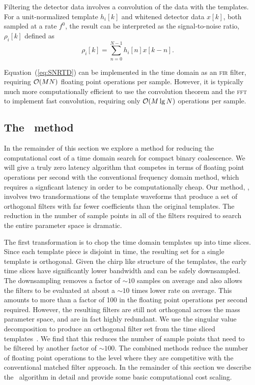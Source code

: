 Filtering the detector data involves a convolution of the data with the
templates.  For a unit-normalized template $h_i[k]$ and whitened detector data $x[k]$, both sampled at a rate $f^0$, the result can be interpreted as the signal-to-noise ratio, $\rho_i[k]$ defined as
%
%
\begin{equation}
	\label{eq:SNRTD}
	\rho_i [k] = \sum_{n=0}^{N-1} h_{i}[n] x [k-n].
\end{equation}

Equation~(\ref{eq:SNRTD}) can be implemented in the time domain as an \textsc{fir} filter, requiring $\mathcal O(M N)$ floating point operations per sample.  However, it is typically much more computationally efficient to use the convolution theorem and the \textsc{fft} to implement fast convolution, requiring only $\mathcal O(M \lg N)$ operations per sample.


\subsection{The \lloid\ method}

In the remainder of this section we explore a method for reducing the
computational cost of a time domain search for compact binary coalescence.  We
will give a truly zero latency algorithm that competes in terms of floating point
operations per second with the conventional frequency domain method, which requires a
signficant latency in order to be computationally cheap. Our method, \lloid{},
involves two transformations of the template waveforms that produce a set of orthogonal
filters with far fewer coefficients than the original templates.  The reduction
in the number of sample points in all of the filters required to search the entire
parameter space is dramatic.  

The first transformation is to chop the time domain templates up into time
slices.  Since each template piece is disjoint in time, the resulting set for a
single template is orthogonal.  Given the chirp like structure of the
templates, the early time slices have significantly lower bandwidth and can be
safely downsampled.  The downsampling removes a factor of $\sim 10$ samples on
%
%
average and also allows the filters to be evaluated at about a $\sim 10$ times
lower rate on average.  This amounts to more than a factor of 100 in the
floating point operations per second required.  However, the resulting filters
are still not orthogonal across the mass parameter space, and are in fact
highly redundant.  We use the singular value decomposition to produce an
orthogonal filter set from the time sliced templates~\cite{Cannon:2010p10398}.
We find that this reduces the number of sample points that need to be filtered
by another factor of $\sim 100$.  The combined methods reduce the number of
floating point operations to the level where they are competitive with the
conventional matched filter approach.  In the remainder of this section we
describe the \lloid\ algorithm in detail and provide some basic computational
cost scaling.  

